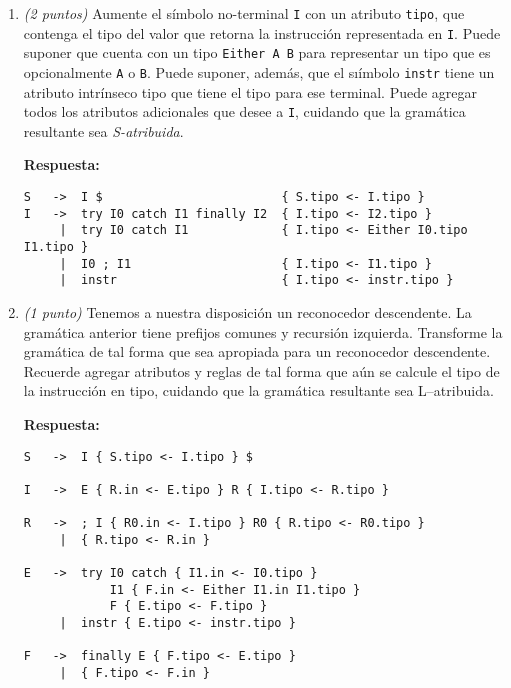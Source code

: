 \documentclass[a4paper,10pt]{article}
\begin{document}
\begin{enumerate}
        \begin{enumerate}
            \item \textit{(2 puntos)} Aumente el s\'imbolo no-terminal \verb|I| con un atributo 
            \verb|tipo|, que contenga el tipo del valor que retorna la instrucci\'on representada 
            en \verb|I|. Puede suponer que cuenta con un tipo \verb|Either A B| para representar 
            un tipo que es opcionalmente \verb|A| o \verb|B|. Puede suponer, adem\'as, que el 
            sı\'imbolo \verb|instr| tiene un atributo intr\'inseco tipo que tiene el tipo para ese 
            terminal. Puede agregar todos los atributos adicionales que desee a \verb|I|, cuidando 
            que la gram\'atica resultante sea \textit{S-atribuida}.

            \textbf{Respuesta:}
            \begin{verbatim}
S   ->  I $                         { S.tipo <- I.tipo }  
I   ->  try I0 catch I1 finally I2  { I.tipo <- I2.tipo }
     |  try I0 catch I1             { I.tipo <- Either I0.tipo I1.tipo }
     |  I0 ; I1                     { I.tipo <- I1.tipo }
     |  instr                       { I.tipo <- instr.tipo }
            \end{verbatim}
            \newpage

            \item \textit{(1 punto)} Tenemos a nuestra disposici\'on un reconocedor descendente. 
            La gram\'atica anterior tiene prefijos comunes y recursi\'on izquierda. Transforme la 
            gram\'atica de tal forma que sea apropiada para un reconocedor descendente. Recuerde 
            agregar atributos y reglas de tal forma que a\'un se calcule el tipo de la instrucci\'on
            en tipo, cuidando que la gram\'atica resultante sea L–atribuida.
            
            \textbf{Respuesta:} 

            \begin{verbatim}
S   ->  I { S.tipo <- I.tipo } $  

I   ->  E { R.in <- E.tipo } R { I.tipo <- R.tipo }   

R   ->  ; I { R0.in <- I.tipo } R0 { R.tipo <- R0.tipo }
     |  { R.tipo <- R.in }

E   ->  try I0 catch { I1.in <- I0.tipo } 
            I1 { F.in <- Either I1.in I1.tipo } 
            F { E.tipo <- F.tipo }   
     |  instr { E.tipo <- instr.tipo } 
     
F   ->  finally E { F.tipo <- E.tipo }       
     |  { F.tipo <- F.in }
            \end{verbatim}
            \vspace*{1cm}
        

\end{enumerate}
\end{enumerate}
\end{document}
